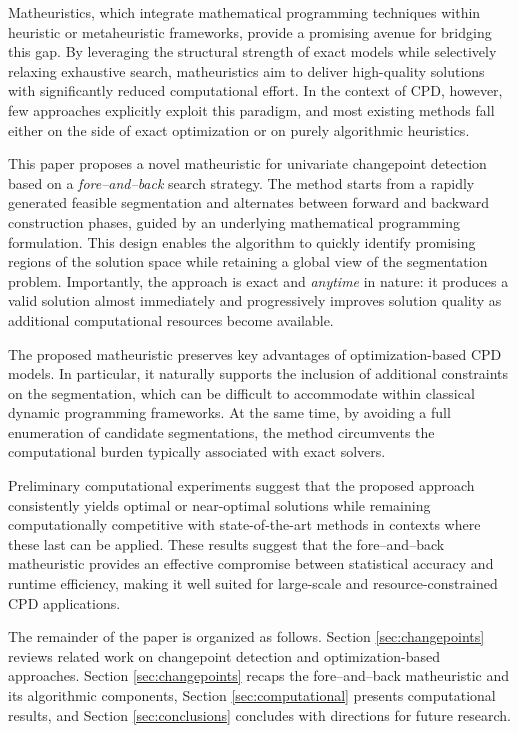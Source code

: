 \documentclass[runningheads]{llncs}
\begin{document}
Matheuristics, which integrate mathematical programming techniques within heuristic or metaheuristic frameworks, provide a promising avenue for bridging this gap. By leveraging the structural strength of exact models while selectively relaxing exhaustive search, matheuristics aim to deliver high-quality solutions with significantly reduced computational effort. In the context of CPD, however,  few approaches explicitly exploit this paradigm, and most existing methods fall either on the side of exact optimization or on purely algorithmic heuristics.

This paper proposes a novel matheuristic for univariate changepoint detection based on a {\it fore–and–back} search strategy. The method starts from a rapidly generated feasible segmentation and alternates between forward and backward construction phases, guided by an underlying mathematical programming formulation. This design enables the algorithm to quickly identify promising regions of the solution space while retaining a global view of the segmentation problem. Importantly, the approach is exact and {\it anytime} in nature: it produces a valid solution almost immediately and progressively improves solution quality as additional computational resources become available.

The proposed matheuristic preserves key advantages of optimization-based CPD models. In particular, it naturally supports the inclusion of additional constraints on the segmentation, which can be difficult to accommodate within classical dynamic programming frameworks. At the same time, by avoiding a full enumeration of candidate segmentations, the method circumvents the computational burden typically associated with exact solvers.

Preliminary computational experiments suggest that the proposed approach consistently yields optimal or near-optimal solutions while remaining computationally competitive with state-of-the-art methods in contexts where these last can be applied. These results suggest that the fore–and–back matheuristic provides an effective compromise between statistical accuracy and runtime efficiency, making it well suited for large-scale and resource-constrained CPD applications.

The remainder of the paper is organized as follows. Section \ref{sec:changepoints} reviews related work on changepoint detection and optimization-based approaches. Section \ref{sec:changepoints} recaps the fore–and–back matheuristic and its algorithmic components, Section \ref{sec:computational} presents computational results, and Section \ref{sec:conclusions} concludes with directions for future research.
\end{document}
